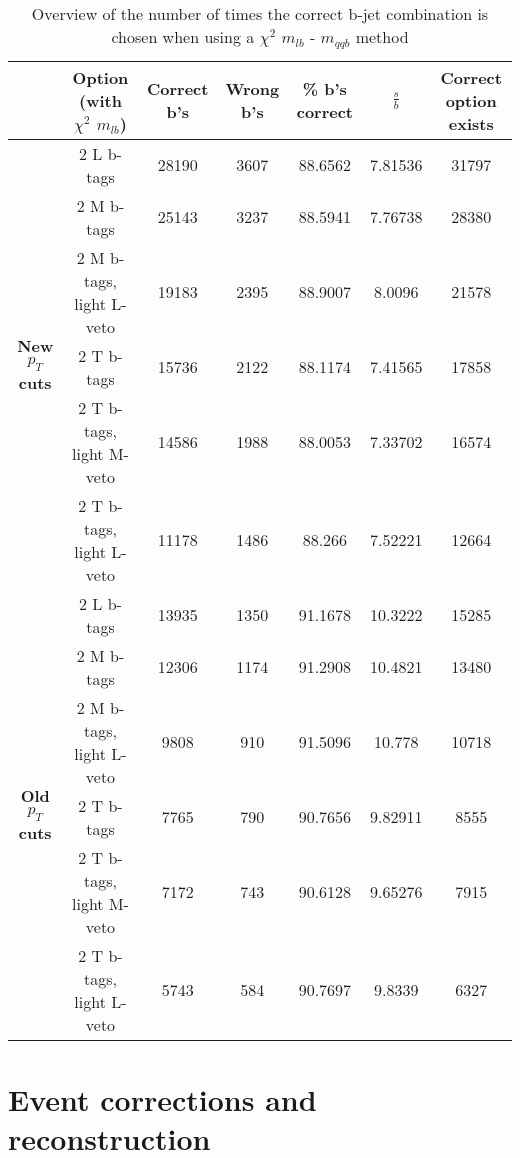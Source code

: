 \documentclass[a4paper,12pt]{report}
\begin{document}
\begin{landscape}
 \begin{table}[!h] 
 \begin{tabular}{c|c|c|c|c|c|c} 
& \textbf{Option} (with $\chi^{2}$ $m_{lb}$) & Correct b's & Wrong b's & \% b's correct   & $\frac{s}{b}$ & Correct option exists \\ \hline 
\multirow{6}{*}{\textbf{New $p_T$ cuts}}
& 2 L b-tags              & 28190 & 3607 & 88.6562 & 7.81536 & 31797 \\ 
& 2 M b-tags              & 25143 & 3237 & 88.5941 & 7.76738 & 28380 \\ 
& 2 M b-tags, light L-veto & 19183 & 2395 & 88.9007 & 8.0096 & 21578 \\ 
& 2 T b-tags              & 15736 & 2122 & 88.1174 & 7.41565 & 17858 \\ 
& 2 T b-tags, light M-veto & 14586 & 1988 & 88.0053 & 7.33702 & 16574 \\ 
& 2 T b-tags, light L-veto & 11178 & 1486 & 88.266 & 7.52221 & 12664 \\ 
\hline
\multirow{6}{*}{\textbf{Old $p_T$ cuts}} 
& 2 L b-tags              & 13935 & 1350 & 91.1678 & 10.3222 & 15285 \\ 
& 2 M b-tags              & 12306 & 1174 & 91.2908 & 10.4821 & 13480 \\ 
& 2 M b-tags, light L-veto & 9808 & 910 & 91.5096 & 10.778 & 10718 \\ 
& 2 T b-tags              & 7765 & 790 & 90.7656 & 9.82911 & 8555 \\ 
& 2 T b-tags, light M-veto & 7172 & 743 & 90.6128 & 9.65276 & 7915 \\ 
& 2 T b-tags, light L-veto & 5743 & 584 & 90.7697 & 9.8339 & 6327 \\ 
 \end{tabular} 
 \caption{Overview of the number of times the correct b-jet combination is chosen when using a $\chi^{2}$ $m_{lb}$ - $m_{qqb}$ method} 
 \end{table} 

\end{landscape}

\chapter{Event corrections and reconstruction}
\end{document}
